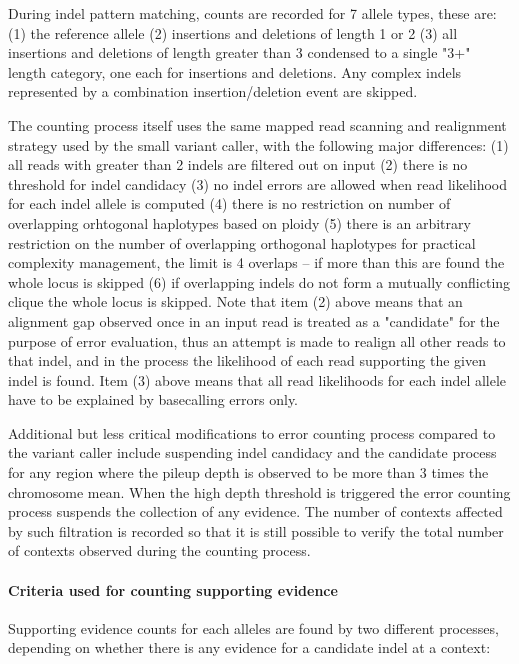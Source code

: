\documentclass{article}
\begin{document}
During indel pattern matching, counts are recorded for 7 allele types, these are: (1) the reference allele (2) insertions and deletions of length 1 or 2 (3) all insertions and deletions of length greater than 3 condensed to a single "3+" length category, one each for insertions and deletions. Any complex indels represented by a combination insertion/deletion event are skipped.

The counting process itself uses the same mapped read scanning and realignment strategy used by the small variant caller, with the following major differences: (1) all reads with greater than 2 indels are filtered out on input (2) there is no threshold for indel candidacy (3) no indel errors are allowed when read likelihood for each indel allele is computed (4)  there is no restriction on number of overlapping orhtogonal haplotypes based on ploidy (5) there is an arbitrary restriction on the number of overlapping orthogonal haplotypes for practical complexity management, the limit is 4 overlaps -- if more than this are found the whole locus is skipped (6) if overlapping indels do not form a mutually conflicting clique the whole locus is skipped. Note that item (2) above means that an alignment gap observed once in an input read is treated as a "candidate" for the purpose of error evaluation, thus an attempt is made to realign all other reads to that indel, and in the process the likelihood of each read supporting the given indel is found. Item (3) above means that all read likelihoods for each indel allele have to be explained by basecalling errors only.

Additional but less critical modifications to error counting process compared to the variant caller include suspending indel candidacy and the candidate process for any region where the pileup depth is observed to be more than 3 times the chromosome mean. When the high depth threshold is triggered the error counting process suspends the collection of any evidence. The number of contexts affected by such filtration is recorded so that it is still possible to verify the total number of contexts observed during the counting process.

\paragraph{Criteria used for counting supporting evidence}

Supporting evidence counts for each alleles are found by two different processes, depending on whether there is any evidence for a candidate indel at a context:
\end{document}
